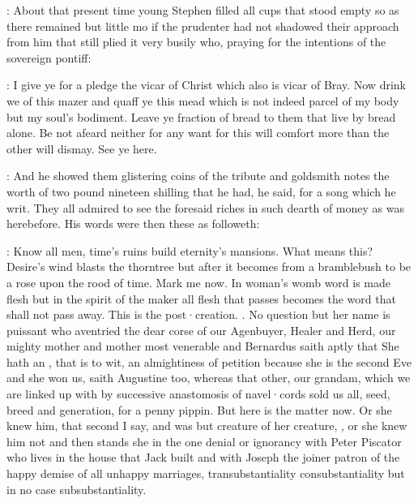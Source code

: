 
:
About that present time young Stephen filled all cups that stood
empty so as there remained but little mo if the prudenter had not shadowed
their approach from him that still plied it very busily who,
praying for
the intentions
of the sovereign pontiff:

\stephen:
I give ye for a pledge the vicar of Christ which also is vicar of Bray.
Now drink we of this mazer and quaff ye this mead which is not indeed parcel of my body but my soul's bodiment.
Leave ye fraction of bread to them that live by bread alone.
Be not afeard neither for any want for this will comfort more than the other will dismay.
See ye here.

:
And he showed them glistering coins of the tribute and goldsmith
notes the worth of two pound nineteen shilling that he had,
he said,
for a
song which he writ.
They all admired to see the foresaid riches in such
dearth of money as was herebefore.
His words were then these as followeth:

\stephen:
Know all men,
time's ruins build eternity's mansions.
What means this?
Desire's wind blasts the thorntree
but after it becomes from a bramblebush to be a
rose upon the rood of time.
Mark me now.
In woman's womb word is made
flesh but in the spirit of the maker all flesh that passes becomes the
word that shall not pass away.
This is the post·creation.
.
No question but her name is puissant who aventried the dear corse of our Agenbuyer,
Healer and Herd,
our mighty mother and mother most
venerable and Bernardus saith aptly that She hath an ,
that is to wit,
an almightiness of petition because
she is the second Eve and she won us,
saith Augustine too,
whereas that
other,
our grandam,
which we are linked up with by successive anastomosis
of navel·cords sold us all,
seed,
breed and generation,
for a penny
pippin.
But here is the matter now.
Or she knew him,
that second I say,
and was but creature of her creature,
,
or she knew him not and then stands she in the one denial or
ignorancy with Peter Piscator who lives in the house that Jack built and
with Joseph the joiner patron of the happy demise of all unhappy
marriages,
 transubstantiality  consubstantiality
but in no case subsubstantiality.

